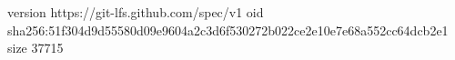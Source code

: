 version https://git-lfs.github.com/spec/v1
oid sha256:51f304d9d55580d09e9604a2c3d6f530272b022ce2e10e7e68a552cc64dcb2e1
size 37715
